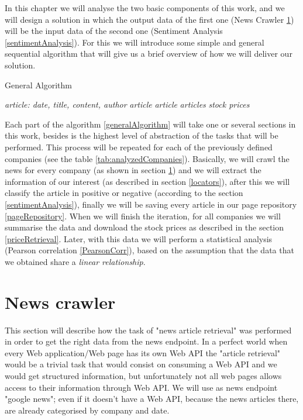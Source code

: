 In this chapter we will analyse the two basic components of this work, and we will design a solution in which the output data of the first one (News Crawler \ref{newsCrawler}) will be the input data of the second one (Sentiment Analysis \ref{sentimentAnalysis}). For this we will introduce some simple and general sequential algorithm that will give us a brief overview of how we will deliver our solution.


\begin{algorithm}
\caption{General Algorithm}\label{generalAlgorithm}
\begin{algorithmic}[1]
	\STATE {}
	\STATE {} \textit{article: date, title, content, author}\text{;}
	\STATE {} \textit{article}\text{;}
	\STATE {} \textit{article}\text{;}
\ENDFOR
\STATE {} \textit{articles}\text{;}
\STATE {} \textit{stock prices}\text{;}
\end{algorithmic}
\end{algorithm}

Each part of the algorithm \ref{generalAlgorithm} will take one or several sections in this work, besides is the highest level of abstraction of the tasks that will be performed. This process will be repeated for each of the previously defined companies (see the table \ref{tab:analyzedCompanies}). Basically, we will crawl the news for every company (as shown in section \ref{newsCrawler}) and we will extract the information of our interest (as described in section \ref{locators}), after this we will classify the article in positive or negative (according to the section \ref{sentimentAnalysis}), finally we will be saving every article in our page repository \ref{pageRepository}. When we will finish the iteration, for all companies we will summarise the data and download the stock prices as described in the section \ref{priceRetrieval}. Later, with this data we will perform a statistical analysis (Pearson correlation \ref{PearsonCorr}), based on the assumption that the data that we obtained share a \emph{linear relationship}.


\section{News crawler}\label{newsCrawler}

This section will describe how the task of "news article retrieval" was performed in order to get the right data from the news endpoint.
In a perfect world when every Web application/Web page has its own Web API the "article retrieval" would be a trivial task that would consist on consuming a Web API and we would get structured information, but unfortunately not all web pages allows access to their information through Web API.
We will use as news endpoint "google news"; even if it doesn't have a Web API, because the news articles there, are already categorised by company and date.

